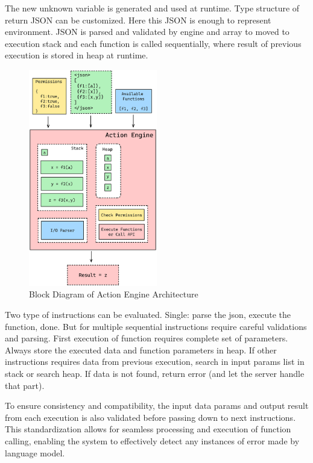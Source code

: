 \documentclass[conference]{IEEEtran}
\begin{document}
The new unknown variable is generated and used at runtime. Type structure of return JSON can be customized. Here this JSON is enough to represent environment. JSON is parsed and validated by engine and array to moved to execution stack and each function is called sequentially, where result of previous execution is stored in heap at runtime.

\begin{figure}[htbp]
\centering
\includegraphics[width=0.5\textwidth]{images/action-engine.png}
\caption{Block Diagram of Action Engine Architecture}
\label{fig}
\end{figure}

Two type of instructions can be evaluated. Single: parse the json, execute the function, done. But for multiple sequential instructions require careful validations and parsing. First execution of function requires complete set of parameters. Always store the executed data and function parameters in heap. If other instructions requires data from previous execution, search in input params list in stack or search heap. If data is not found, return error (and let the server handle that part).

To ensure consistency and compatibility, the input data params and output result from each execution is also validated before passing down to next instructions. This standardization allows for seamless processing and execution of function calling, enabling the system to effectively detect any instances of error made by language model.
\end{document}
